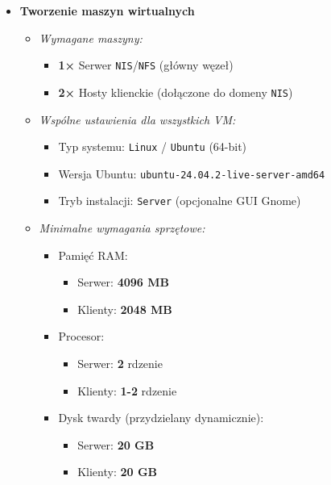 \begin{itemize}
      \item \textbf{Tworzenie maszyn wirtualnych}
      \begin{itemize}
          \item \textit{Wymagane maszyny:}
          \begin{itemize}
              \item \textbf{1×} Serwer \texttt{NIS}/\texttt{NFS} (główny węzeł)
              \item \textbf{2×} Hosty klienckie (dołączone do domeny \texttt{NIS})
          \end{itemize}
          \item \textit{Wspólne ustawienia dla wszystkich VM:}
          \begin{itemize}
              \item Typ systemu: \texttt{Linux} / \texttt{Ubuntu} (64-bit)
              \item Wersja Ubuntu: \texttt{ubuntu-24.04.2-live-server-amd64}
              \item Tryb instalacji: \texttt{Server} (opcjonalne GUI Gnome)
          \end{itemize}
          \item \textit{Minimalne wymagania sprzętowe:}
          \begin{itemize}
              \item Pamięć RAM: 
              \begin{itemize}
                  \item Serwer: \textbf{4096 MB} 
                  \item Klienty: \textbf{2048 MB}
              \end{itemize}
              \item Procesor: 
              \begin{itemize}
                  \item Serwer: \textbf{2} rdzenie
                  \item Klienty: \textbf{1-2} rdzenie
              \end{itemize}
              \item Dysk twardy (przydzielany dynamicznie): 
              \begin{itemize}
                  \item Serwer: \textbf{20 GB}
                  \item Klienty: \textbf{20 GB}
              \end{itemize}

\end{itemize}
\end{itemize}
\end{itemize}
